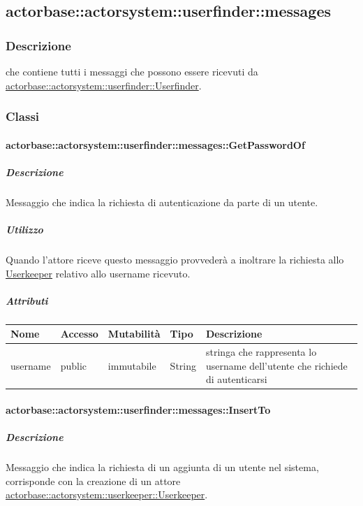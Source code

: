 \documentclass{scalatekids-article}
\begin{document}
\subsection{actorbase::actorsystem::userfinder::messages}
\label{sec:actorbase::actorsystem::userfinder::messages}

\subsubsection{Descrizione}
 che contiene tutti i messaggi che possono essere ricevuti da
\hyperref[sec:actorbase::actorsystem::userfinder::Userfinder]{actorbase::actorsystem::userfinder::Userfinder}.

\subsubsection{Classi}

\paragraph{actorbase::actorsystem::userfinder::messages::GetPasswordOf}
\label{sec:actorbase::actorsystem::userfinder::messages::GetPasswordOf}

\subparagraph{Descrizione}
Messaggio che indica la richiesta di autenticazione da parte di un utente.\\

\subparagraph{Utilizzo}
Quando l'attore riceve questo messaggio provvederà a inoltrare la richiesta
allo \hyperref[sec:actorbase::actorsystem::userkeeper::Userkeeper]{Userkeeper}
relativo allo username ricevuto.

\subparagraph{Attributi}
\begin{tabular}{| p{3cm} | p{1.5cm} | p{2cm} | p{2cm} | p{8.5cm} |}
  \hline
  Nome & Accesso & Mutabilità & Tipo & Descrizione\\
  \hline
  username & public & immutabile & String & stringa che rappresenta lo username dell'utente che richiede di autenticarsi\\
  \hline
\end{tabular}

\paragraph{actorbase::actorsystem::userfinder::messages::InsertTo}
\label{sec:actorbase::actorsystem::userfinder::messages::InsertTo}

\subparagraph{Descrizione}
Messaggio che indica la richiesta di un aggiunta di un utente nel sistema,
corrisponde con la creazione di un attore \hyperref[sec:actorbase::actorsystem::userkeeper::Userkeeper]{actorbase::\allowbreak{}actorsystem::\allowbreak{}userkeeper::\allowbreak{}Userkeeper}.
\end{document}
